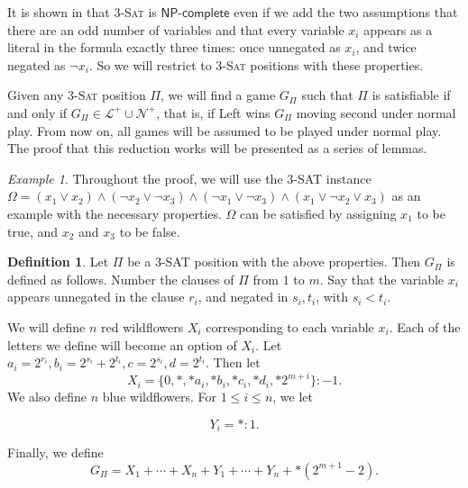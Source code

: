 \documentclass{amsart}
\theoremstyle{plain}
\theoremstyle{definition}
\newtheorem{defn}[thm]{Definition}
\theoremstyle{remark}
\newtheorem{ex}[thm]{Example}
\numberwithin{equation}{section}
\numberwithin{thm}{section}
\begin{document}
It is shown in \cite{tovey3SAT} that \textsc{3-Sat} is $\mathsf{NP\text{-}complete}$ even if we add the two assumptions that there are an odd number of variables and that every variable $x_i$ appears as a literal in the formula exactly three times: once unnegated as $x_i$, and twice negated as $\neg x_i$. So we will restrict to \textsc{3-Sat} positions with these properties.

Given any \textsc{3-Sat} position $\Pi$, we will find a game $G_{\Pi}$ such that $\Pi$ is satisfiable if and only if $G_{\Pi} \in \mathcal{L }^+ \cup \mathcal{ N}^+$, that is, if Left wins $G_{\Pi}$ moving second under normal play. From now on, all games will be assumed to be played under normal play. The proof that this reduction works will be presented as a series of lemmas.
\begin{ex}
    Throughout the proof, we will use the \textsc{3-SAT} instance $\Omega = (x_1 \vee x_2 ) \land (\neg x_2 \vee \neg x_3) \wedge (\neg x_1 \vee \neg x_3) \wedge ( x_1 \vee\neg x_2 \vee x_3 )$ as an example with the necessary properties. $\Omega$ can be satisfied by assigning $x_1$ to be true, and $x_2$ and $x_3$ to be false.
\end{ex}
\begin{defn}
     Let $\Pi$ be a \textsc{3-SAT} position with the above properties. Then $G_{\Pi}$ is defined as follows. Number the clauses of $\Pi$ from $1$ to $m$. Say that the variable $x_i$ appears unnegated in the clause $r_i$, and negated in $s_i,t_i$, with $s_i < t_i$. 
     
     We will define $n$ red wildflowers $X_i$ corresponding to each variable $x_i$. Each of the letters we define will become an option of $X_i$. Let $a_i = 2^{r_i},b_i = 2^{s_i}+2^{t_i},c=2^{s_i},d=2^{t_i}$. Then let \begin{equation}
X_i = \{0,*,*a_i,*b_i,*c_i,*d_i,*2^{m+i}\}:-1.
\end{equation}
We also define $n$ blue wildflowers. For $1 \leq i \leq n$, we let

\begin{equation}
    Y_i = *:1.
\end{equation}

Finally, we define \begin{equation}
    G_{\Pi} = X_1 + \cdots + X_n + Y_1 + \cdots + Y_n + *(2^{m+1}-2).
\end{equation}
\end{defn}
\end{document}
